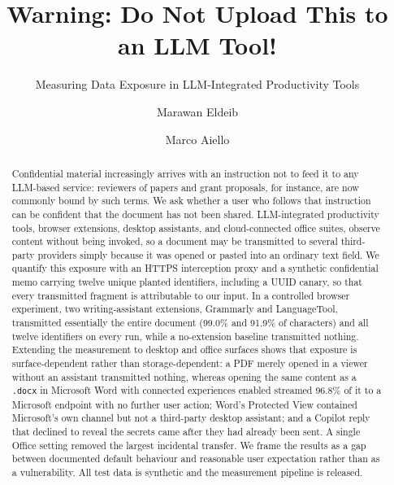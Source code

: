 \documentclass[sigconf,anonymous,review,balance=false]{acmart}
\begin{document}
\title[Warning: Do Not Upload This to an LLM Tool!]{Warning: Do Not Upload This to an LLM Tool!}
\subtitle{Measuring Data Exposure in LLM-Integrated Productivity Tools}

\author{Marawan Eldeib}

\author{Marco Aiello}

\renewcommand{\shortauthors}{Eldeib and Aiello}

\begin{abstract}
Confidential material increasingly arrives with an instruction not to feed it to any
LLM-based service: reviewers of papers and grant proposals, for instance, are now commonly
bound by such terms. We ask whether a user who follows that instruction can be confident
that the document has not been shared. LLM-integrated productivity tools, browser
extensions, desktop assistants, and cloud-connected office suites, observe content without
being invoked, so a document may be transmitted to several third-party providers simply
because it was opened or pasted into an ordinary text field. We quantify this exposure with
an HTTPS interception proxy and a synthetic confidential memo carrying twelve unique planted
identifiers, including a UUID canary, so that every transmitted fragment is attributable to
our input. In a controlled browser experiment, two writing-assistant extensions, Grammarly
and LanguageTool, transmitted essentially the entire document (99.0\% and 91.9\% of
characters) and all twelve identifiers on every run, while a no-extension baseline
transmitted nothing. Extending the measurement to desktop and office surfaces shows that
exposure is surface-dependent rather than storage-dependent: a PDF merely opened in a
viewer without an assistant transmitted nothing, whereas opening the same content as a
\texttt{.docx} in Microsoft Word with connected experiences enabled streamed 96.8\% of it
to a Microsoft endpoint with no further user action; Word's Protected View contained Microsoft's own channel but not a
third-party desktop assistant; and a Copilot reply that declined to reveal the secrets came
after they had already been sent. A single Office setting removed the largest incidental
transfer. We frame the results as a gap between documented default behaviour and reasonable
user expectation rather than as a vulnerability. All test data is synthetic and the
measurement pipeline is released.
\end{abstract}
\end{document}
